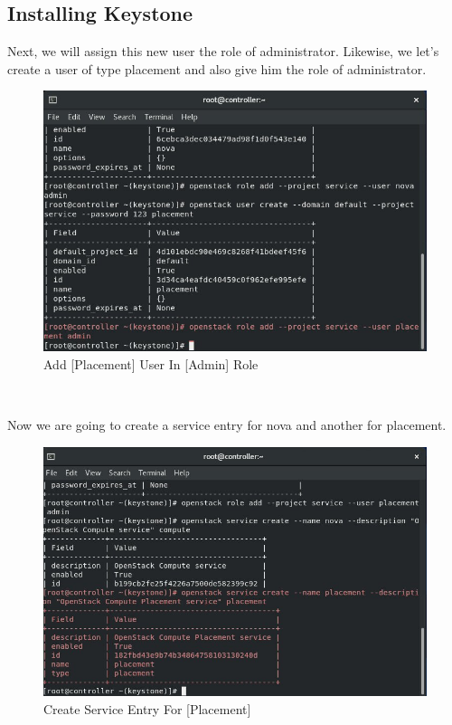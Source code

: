 \begin{spacing}{1.2}
\section{Installing Keystone}

\par Next, we will assign this new user the role of administrator. Likewise, we
let's create a user of type placement and also give him the role of administrator. 
\\
\begin{figure}[!htb] 
\begin{center} 
\includegraphics[width=1\linewidth]{Cloud/Nova Setup in Keystone/Add [Placement] User In [Admin] Role}
\end{center} 
\caption{Add [Placement] User In [Admin] Role} 
\end{figure}  \FloatBarrier 
\\
\par Now we are going to create a service entry for nova and another for placement. 
\begin{figure}[!htb] 
\begin{center} 
\includegraphics[width=1\linewidth]{Cloud/Nova Setup in Keystone/Create Service Entry For [Placement]} 
\end{center} 
\caption{Create Service Entry For [Placement]} 
\end{figure}  \FloatBarrier 
\\


\end{spacing}

